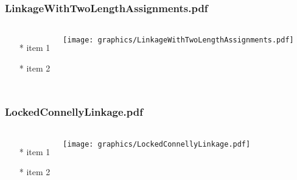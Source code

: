\begin{frame} \frametitle{LinkageWithTwoLengthAssignments.pdf}
    \begin{columns}[c]
        \begin{itemize}
            \item[*] item 1
            \item[*] item 2
        \end{itemize}
        \begin{minipage}{\linewidth}
            \begin{center}
            \texttt{[image: graphics/LinkageWithTwoLengthAssignments.pdf]}
            \label{gfx:LinkageWithTwoLengthAssignments.pdf}
            \end{center}
        \end{minipage}
    \end{columns}
\end{frame}
\begin{frame} \frametitle{LockedConnellyLinkage.pdf}
    \begin{columns}[c]
        \begin{itemize}
            \item[*] item 1
            \item[*] item 2
        \end{itemize}
        \begin{minipage}{\linewidth}
            \begin{center}
            \texttt{[image: graphics/LockedConnellyLinkage.pdf]}
            \label{gfx:LockedConnellyLinkage.pdf}
            \end{center}
        \end{minipage}
    \end{columns}
\end{frame}
